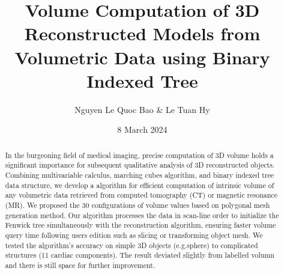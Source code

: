 \documentclass[11pt]{article}
\title{Volume Computation of 3D Reconstructed Models from Volumetric Data using Binary Indexed Tree}
\author{Nguyen Le Quoc Bao \& Le Tuan Hy}
\date{8 March 2024}
\begin{document}
\maketitle

\begin{center}
\begin{minipage}{0.8\textwidth}
\setlength{\leftskip}{3.5cm} 
\setlength{\rightskip}{3.5cm}
\begin{abstract}
    In the burgeoning field of medical imaging, precise computation of 3D volume holds a significant importance for subsequent qualitative analysis of 3D reconstructed objects. Combining multivariable calculus, marching cubes algorithm, and binary indexed tree data structure, we develop a algorithm for efficient computation of intrinsic volume of any volumetric data retrieved from computed tomography (CT) or magnetic resonance (MR). We proposed the 30 configurations of volume values based on polygonal mesh generation method. Our algorithm processes the data in scan-line order to initialize the Fenwick tree simultaneously with the reconstruction algorithm, ensuring faster volume query time following users edition such as slicing or transforming object mesh. We tested the algorithm's accuracy on simple 3D objects (e.g.sphere) to complicated structures (11 cardiac components). The result deviated slightly from labelled volumn and there is still space for further improvement.
\end{abstract}
\end{minipage}
\end{center}
\end{document}
